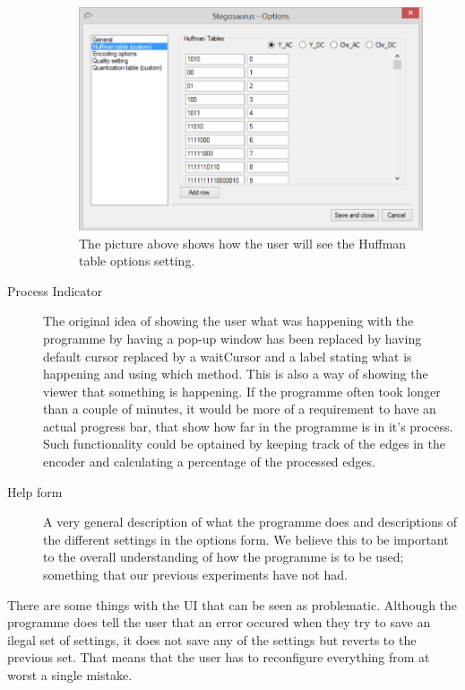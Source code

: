 \begin{description}
\begin{figure}
	\centering
	\includegraphics[width=1\textwidth]{figures/StegoOptionHuff2.png}
	\caption{The picture above shows how the user will see the Huffman table options setting.}
	\label{fig:StegoOptionHuff2}
\end{figure}

\item[Process Indicator]
The original idea of showing the user what was happening with the programme by having a pop-up window has been replaced by having default cursor replaced by a waitCursor and a label stating what is happening and using which method.
This is also a way of showing the viewer that something is happening.
If the programme often took longer than a couple of minutes, it would be more of a requirement to have an actual progress bar, that show how far in the programme is in it's process. Such functionality could be optained by keeping track of the edges in the encoder and calculating a percentage of the processed edges.

\item[Help form]
A very general description of what the programme does and descriptions of the different settings in the options form.
We believe this to be important to the overall understanding of how the programme is to be used; something that our previous experiments have not had.
\end{description}

There are some things with the UI that can be seen as problematic.
Although the programme does tell the user that an error occured when they try to save an ilegal set of settings, it does not save any of the settings but reverts to the previous set. That means that the user has to reconfigure everything from at worst a single mistake.

